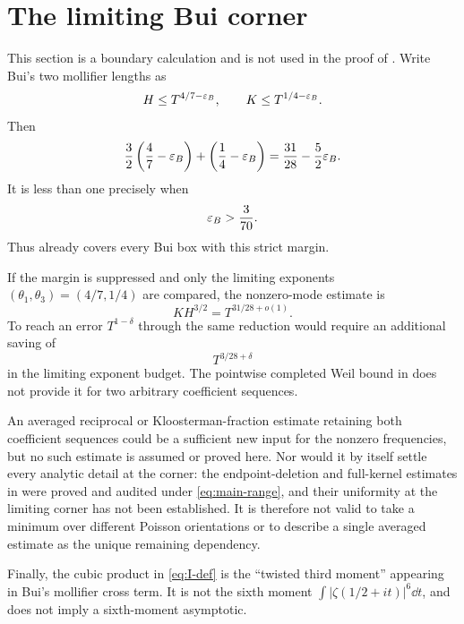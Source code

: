 \section{The limiting Bui corner}
\label{sec:bui-corner}

This section is a boundary calculation and is not used in the proof of
.  Write Bui's two mollifier lengths as
\begin{equation}\label{eq:Bui-box}
 H\leq T^{4/7-\varepsilon_B},\qquad
 K\leq T^{1/4-\varepsilon_B}.
\end{equation}
Then
\begin{equation}\label{eq:Bui-fixed-Weil-exponent}
 \frac32\left(\frac47-\varepsilon_B\right)
 +\left(\frac14-\varepsilon_B\right)
 =\frac{31}{28}-\frac52\varepsilon_B.
\end{equation}
It is less than one precisely when
\begin{equation}\label{eq:Bui-threshold}
                              \varepsilon_B>\frac{3}{70}.
\end{equation}
Thus  already covers every Bui box with this strict margin.

If the margin is suppressed and only the limiting exponents
$(\theta_1,\theta_3)=(4/7,1/4)$ are compared, the nonzero-mode estimate is
\begin{equation}\label{eq:Bui-limiting-budget}
                    KH^{3/2}=T^{31/28+o(1)}.
\end{equation}
To reach an error $T^{1-\delta}$ through the same reduction would require an
additional saving of
\begin{equation}\label{eq:Bui-needed-saving}
                              T^{3/28+\delta}
\end{equation}
in the limiting exponent budget.  The pointwise completed Weil bound in
 does not provide it for two arbitrary coefficient
sequences.

An averaged reciprocal or Kloosterman-fraction estimate retaining both
coefficient sequences could be a sufficient new input for the nonzero
frequencies, but no such estimate is assumed or proved here.  Nor would it by
itself settle every analytic detail at the corner: the endpoint-deletion and
full-kernel estimates in  were proved and audited under
\eqref{eq:main-range}, and their uniformity at the limiting corner has not
been established.  It is therefore not valid to take a minimum over different
Poisson orientations or to describe a single averaged estimate as the unique
remaining dependency.

Finally, the cubic product in \eqref{eq:I-def} is the ``twisted third
moment'' appearing in Bui's mollifier cross term.  It is not the sixth moment
$\int|\zeta(1/2+it)|^6\dd t$, and  does not imply a sixth-moment
asymptotic.
